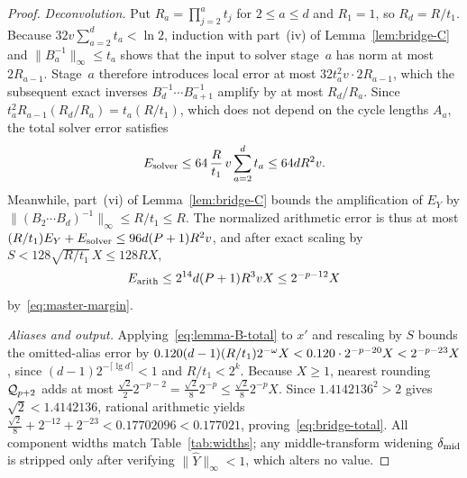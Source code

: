 \begin{proof}
\emph{Deconvolution.} Put $R_a=\prod_{j=2}^a t_j$ for $2\le a\le d$ and $R_1=1$, so $R_d=R/t_1$. Because
$32v\sum_{a=2}^d t_a<\ln 2$, induction with part~(iv) of Lemma~\ref{lem:bridge-C} and $\|B_a^{-1}\|_\infty\le t_a$ shows
that the input to solver stage~$a$ has norm at most $2R_{a-1}$. Stage~$a$ therefore introduces local error at most
$32t_a^2 v\cdot 2R_{a-1}$, which the subsequent exact inverses $B_d^{-1}\cdots B_{a+1}^{-1}$ amplify by at most
$R_d/R_a$. Since $t_a^2 R_{a-1}(R_d/R_a)=t_a(R/t_1)$, which does not depend on the cycle lengths $A_a$, the total solver
error satisfies
\[
  E_{\rm solver}\le 64\,\frac{R}{t_1}\,v\sum_{a=2}^d t_a\le 64dR^2 v.
\]
Meanwhile, part~(vi) of Lemma~\ref{lem:bridge-C} bounds the amplification of $E_Y$ by
$\|(B_2\cdots B_d)^{-1}\|_\infty\le R/t_1\le R$.
The normalized arithmetic error is thus at most $(R/t_1)E_Y+E_{\rm solver}\le 96d(P+1)R^2 v$, and after exact scaling by
$S<128\sqrt{R/t_1}\,X\le 128RX$,
\[
  E_{\rm arith}\le 2^{14}d(P+1)R^3 v X\le 2^{-p-12}X
\]
by~\eqref{eq:master-margin}.

\emph{Aliases and output.} Applying~\eqref{eq:lemma-B-total} to $x'$ and rescaling by $S$ bounds the omitted-alias error
by $0.120(d-1)(R/t_1)2^{-\omega}X<0.120\cdot 2^{-p-20}X<2^{-p-23}X$, since $(d-1)2^{-\lceil\lg d\rceil}<1$ and $R/t_1<2^k$.
Because $X\ge 1$, nearest rounding $\mathcal{Q}_{p+2}$ adds at most
$\frac{\sqrt2}{2}2^{-p-2}=\frac{\sqrt2}{8}2^{-p}\le\frac{\sqrt2}{8}2^{-p}X$. Since $1.4142136^2>2$ gives
$\sqrt2<1.4142136$, rational arithmetic yields $\frac{\sqrt2}{8}+2^{-12}+2^{-23}<0.17702096<0.177021$,
proving~\eqref{eq:bridge-total}. All component widths match Table~\ref{tab:widths}; any middle-transform widening
$\delta_{\rm mid}$ is stripped only after verifying $\|\widehat Y\|_\infty<1$, which alters no value.
\end{proof}

